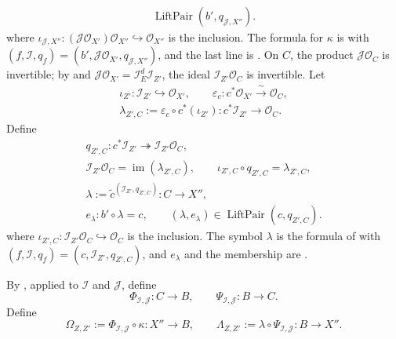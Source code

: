 \begin{definition}
\[\begin{gathered}
      \operatorname{LiftPair}(b',q_{\mathcal J,X''}).
  \end{gathered}                                             \tag{CB0}
  \]
  where
  $\iota_{\mathcal J,X''}\colon
  (\mathcal J\mathcal O_{X'})\mathcal O_{X''}
  \hookrightarrow\mathcal O_{X''}$ is the inclusion.  The formula for
  $\kappa$ is
   with
  $(f,\mathcal I,q_f)=(b',\mathcal J\mathcal O_{X'},
  q_{\mathcal J,X''})$, and the last line is
  .  On $C$, the product
  $\mathcal J\mathcal O_C$ is invertible; by
   and
  $\mathcal J\mathcal O_{X'}=\mathcal I_E^d\mathcal I_{Z'}$, the ideal
  $\mathcal I_{Z'}\mathcal O_C$ is invertible.  Let
  \[
  \begin{gathered}
    \iota_{Z'}\colon\mathcal I_{Z'}\hookrightarrow\mathcal O_{X'},\qquad
    \varepsilon_c\colon c^*\mathcal O_{X'}
      \xrightarrow{\ \sim\ }\mathcal O_C,\\
    \lambda_{Z',C}:=\varepsilon_c\circ c^*(\iota_{Z'})
      \colon c^*\mathcal I_{Z'}\longrightarrow\mathcal O_C.
  \end{gathered}                                               \tag{CBb}
  \]
  Define
  \[
  \begin{gathered}
    q_{Z',C}\colon c^*\mathcal I_{Z'}
      \twoheadrightarrow\mathcal I_{Z'}\mathcal O_C,\\
    \mathcal I_{Z'}\mathcal O_C
      =\operatorname{im}(\lambda_{Z',C}),\qquad
    \iota_{Z',C}\circ q_{Z',C}=\lambda_{Z',C},\\
    \lambda:=
      \widetilde c^{(\mathcal I_{Z'},q_{Z',C})}
      \colon C\longrightarrow X'',\\
    e_\lambda\colon b'\circ\lambda=c,\qquad
    (\lambda,e_\lambda)\in\operatorname{LiftPair}(c,q_{Z',C}).
  \end{gathered}                                             \tag{CB1}
  \]
  where
  $\iota_{Z',C}\colon\mathcal I_{Z'}\mathcal O_C
  \hookrightarrow\mathcal O_C$ is the inclusion.  The symbol $\lambda$ is
  the formula of
   with
  $(f,\mathcal I,q_f)=(c,\mathcal I_{Z'},q_{Z',C})$, and
  $e_\lambda$ and the membership are
  .

  By , applied to
  $\mathcal I$ and $\mathcal J$, define
  \[
    \Phi_{\mathcal I,\mathcal J}\colon C\to B,\qquad
    \Psi_{\mathcal I,\mathcal J}\colon B\to C.
  \]
  Define
  \[
    \Omega_{Z,Z'}:=
      \Phi_{\mathcal I,\mathcal J}\circ\kappa\colon X''\longrightarrow B,
    \qquad
    \Lambda_{Z,Z'}:=
      \lambda\circ\Psi_{\mathcal I,\mathcal J}\colon B\longrightarrow X''.
  \]
\end{definition}

